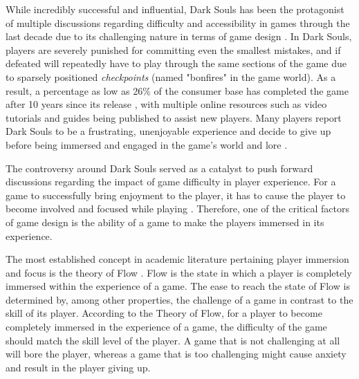 While incredibly successful and influential, Dark Souls has been the protagonist of multiple discussions regarding difficulty and accessibility in games through the last decade due to its challenging nature in terms of game design \cite{ONLINE_GettingWrongDarkSouls}. In Dark Souls, players are severely punished for committing even the smallest mistakes, and if defeated will repeatedly have to play through the same sections of the game due to sparsely positioned \emph{checkpoints} (named "bonfires" in the game world). As a result, a percentage as low as 26\% of the consumer base has completed the game after 10 years since its release \cite{ONLINE_ApproachabilityFixDarkSouls}, with multiple online resources such as video tutorials and guides being published to assist new players. Many players report Dark Souls to be a frustrating, unenjoyable experience and decide to give up before being immersed and engaged in the game's world and lore \cite{ONLINE_ToughLoveDarkSoulsDifficulty}.

The controversy around Dark Souls served as a catalyst to push forward discussions regarding the impact of game difficulty in player experience. For a game to successfully bring enjoyment to the player, it has to cause the player to become involved and focused while playing \cite{ARTICLE_FlowInGames}. Therefore, one of the critical factors of game design is the ability of a game to make the players immersed in its experience. 

The most established concept in academic literature pertaining player immersion and focus is the theory of Flow \cite{BOOK_Flow}. Flow is the state in which a player is completely immersed within the experience of a game. The ease to reach the state of Flow is determined by, among other properties, the challenge of a game in contrast to the skill of its player. According to the Theory of Flow, for a player to become completely immersed in the experience of a game, the difficulty of the game should match the skill level of the player. A game that is not challenging at all will bore the player, whereas a game that is too challenging might cause anxiety and result in the player giving up.

